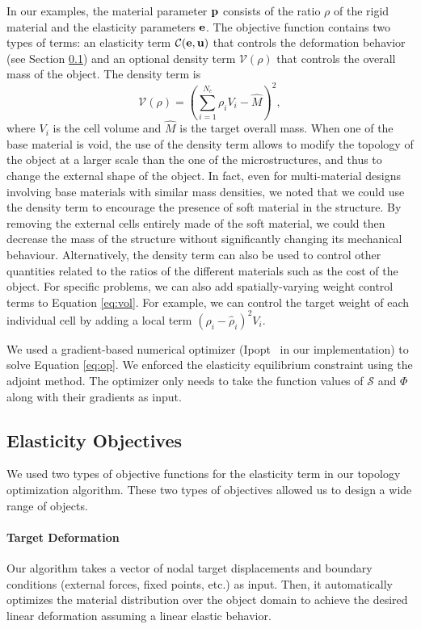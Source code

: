 In our examples, the material parameter $\mathbf{p}$ consists of the ratio $\rho$ of the rigid material and the elasticity parameters $\mathbf{e}$.
The objective function contains two types of terms: an elasticity term $\mathcal{C}(\boldsymbol{\mathbf{e}},\bf u)$ that controls the deformation behavior (see Section \ref{sec:obj}) and an optional density term $\mathcal{V}(\rho)$ that controls the overall mass of the object.
The density term is
\begin{equation}
\mathcal{V}(\rho)=(\sum_{i=1}^{N_c}\rho_iV_i-\hat{M})^2,
\label{eq:vol}
\end{equation}
where $V_i$ is the cell volume and $\hat{M}$ is the target overall mass.
When one of the base material is void, the use of the density term allows to modify the topology of the object at a larger scale than the one of the microstructures, and thus to change the external shape of the object.
In fact, even for multi-material designs involving base materials with similar mass densities, we noted that we could use the density term to encourage the presence of soft material in the structure.
By removing the external cells entirely made of the soft material, we could then decrease the mass of the structure without significantly changing its mechanical behaviour.
Alternatively, the density term can also be used to control other quantities related to the ratios of the different materials such as the cost of the object.
For specific problems, we can also add spatially-varying weight control terms to Equation \ref{eq:vol}.
For example, we can control the target weight of each individual cell by adding a local term $(\rho_i-\hat{\rho}_i)^2V_i$.

We used a gradient-based numerical optimizer (Ipopt~\citep{ipopt} in our implementation) to solve Equation \ref{eq:op}. We enforced the elasticity equilibrium constraint using the adjoint method. The optimizer only needs to take the function values of $\mathcal{S}$ and $\Phi$ along with their gradients as input.

\subsection{Elasticity Objectives}\label{sec:obj}
We used two types of objective functions for the elasticity term in our topology optimization algorithm.
These two types of objectives allowed us to design a wide range of objects.
\paragraph{Target Deformation}\label{sec:strain}
Our algorithm takes a vector of nodal target displacements and boundary conditions (external forces, fixed points, etc.) as input.
Then, it automatically optimizes the material distribution over the object domain to achieve the desired linear deformation assuming a linear elastic behavior.

